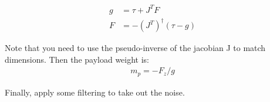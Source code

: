 \documentclass[11pt]{article}
\begin{document}
\begin{align*}
g &= \tau  + J^TF \\
F &= -(J^T)^\dagger (\tau - g) 
\end{align*}

Note that you need to use the pseudo-inverse of the jacobian J to match dimensions.  Then the payload weight is:
\begin{align*}
m_p = -F_z / g 
\end{align*}

Finally, apply some filtering to take out the noise. 
\end{document}

